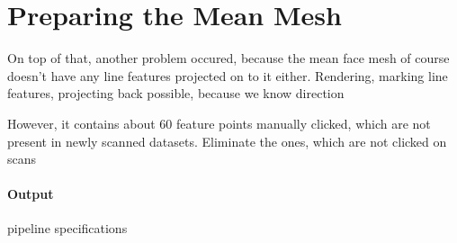 \section{Preparing the Mean Mesh}
On top of that, another problem occured, because the mean face mesh of course doesn't have any line features projected on to it either.
Rendering, marking line features, projecting back possible, because we know direction

However, it contains about 60 feature points manually clicked, which are not present in newly scanned datasets. 
Eliminate the ones, which are not clicked on scans

\paragraph{Output}

pipeline specifications

